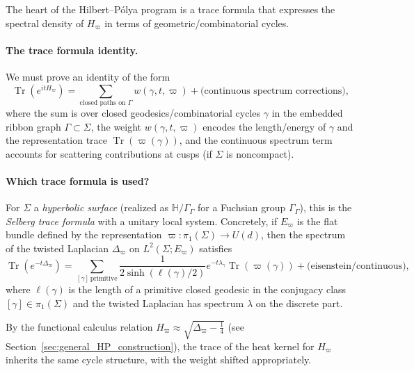 \documentclass[11pt,oneside]{amsbook}
\numberwithin{equation}{section}
\theoremstyle{plain}
\theoremstyle{definition}
\theoremstyle{remark}
\newcommand{\HH}{\mathbb{H}}
\DeclareMathOperator{\Tr}{\mathrm{Tr}}
\begin{document}
The heart of the Hilbert--Pólya program is a trace formula that expresses the spectral density of $H_\varpi$ in terms of geometric/combinatorial cycles.

\paragraph{The trace formula identity.}
We must prove an identity of the form
\begin{equation}
\label{eq:trace_formula_hp_step3}
\Tr(e^{itH_\varpi}) = \sum_{\text{closed paths on } \Gamma} w(\gamma, t, \varpi) + \text{(continuous spectrum corrections)},
\end{equation}
where the sum is over closed geodesics/combinatorial cycles $\gamma$ in the embedded ribbon graph $\Gamma \subset \Sigma$, the weight $w(\gamma, t, \varpi)$ encodes the length/energy of $\gamma$ and the representation trace $\Tr(\varpi(\gamma))$, and the continuous spectrum term accounts for scattering contributions at cusps (if $\Sigma$ is noncompact).

\paragraph{Which trace formula is used?}
For $\Sigma$ a \emph{hyperbolic surface} (realized as $\HH/\Gamma_\Gamma$ for a Fuchsian group $\Gamma_\Gamma$), this is the \emph{Selberg trace formula} with a unitary local system.
Concretely, if $E_\varpi$ is the flat bundle defined by the representation $\varpi:\pi_1(\Sigma) \to U(d)$, then the spectrum of the twisted Laplacian $\Delta_\varpi$ on $L^2(\Sigma;E_\varpi)$ satisfies
\begin{equation}
\label{eq:selberg_twisted}
\Tr(e^{-t\Delta_\varpi}) = \sum_{[\gamma]\,\text{primitive}} \frac{1}{2\sinh(\ell(\gamma)/2)} e^{-t\lambda_\gamma} \Tr(\varpi(\gamma)) + \text{(eisenstein/continuous)},
\end{equation}
where $\ell(\gamma)$ is the length of a primitive closed geodesic in the conjugacy class $[\gamma] \in \pi_1(\Sigma)$ and the twisted Laplacian has spectrum $\lambda$ on the discrete part.

By the functional calculus relation $H_\varpi \approx \sqrt{\Delta_\varpi - \frac{1}{4}}$ (see Section~\ref{sec:general_HP_construction}), the trace of the heat kernel for $H_\varpi$ inherits the same cycle structure, with the weight shifted appropriately.
\end{document}
